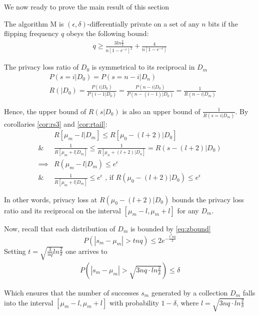 \documentclass[11pt]{article}
\begin{document}
We now ready to prove the main result of this section

\begin{prop} \label{lem:bound}
The algorithm M is $(\epsilon,\delta)$-differentially private on a set of any $n$ bits if the flipping frequency $q$ obeys the following bound:
\begin{align}
 q \ge \frac  { 3  ln\frac{2}{\delta}}  { n \left [ 1 - e^{-\epsilon}\right ] ^2}  + \frac{4}{n \left [ 1 - e^{-\epsilon}\right ] }
\end{align}
\begin{pf}
The privacy loss ratio of $D_0$ is symmetrical to its reciprocal in $D_m$
 \begin{align*}
  & P(s=i| D_0) = P(s = n-i | D_n) \\
  & R( | D_0) = \frac{P(i| D_0)} { P(i-1|D_0)} = \frac{P(n-i | D_0)} { P(n - (i-1)|D_0)} = \frac{1}{R(n-i | D_m)}
  \end{align*}

Hence, the upper bound of $R(s|D_0)$ is also an upper bound of $\frac{1}{R(s=i | D_m)}$.  By corollaries \ref{cor:rs3} and  \ref{cor:rtail}:
 \begin{align*}
& R[\mu_m - l|D_m]  \le R[\mu_0 - (l+2)|D_0]  \\
\& &  \frac{1}{R[\mu_m + l|D_m]} \le \frac{1}{R[\mu_n + (l+2)|D_n]} = R(s - (l+2) | D_0) \\
\implies &  R(\mu_m - l | D_m) \le e^{\epsilon}  \\
\& &  \frac{1} {R[\mu_m + l|D_m]} \le e^\epsilon  \text{ , if }   R(\mu_0 - (l+2) | D_0)  \le e^\epsilon
  \end{align*}

In other words, privacy loss at $R(\mu_0 - (l+2) | D_0)$ bounds the privacy loss ratio and its reciprocal on the interval $[\mu_m - l, \mu_m + l ]$ for any $D_m$. 

Now, recall that each distribution of $D_m$ is bounded by \ref{eq:zbound}
\[ P(|s_m - \mu_m| > tnq) \le 2 e^{- \frac{t^2nq}{3}} \label{eq:bound} \]
Setting $t=\sqrt{\frac{3}{nq} ln\frac{2}{\delta}}$ one arrives to
 \begin{align}
P \left (|s_m - \mu_m| >\sqrt{3nq \cdot ln\frac{2}{\delta}} \right ) \le \delta
\end{align}

Which ensures that the number of successes $s_m$ generated by a collection $D_m$ falls into the interval $[\mu_m - l, \mu_m + l ]$  with probability $1-\delta$, where $l=\sqrt{3nq \cdot ln\frac{2}{\delta}}$


\end{pf}
\end{prop}
\end{document}
